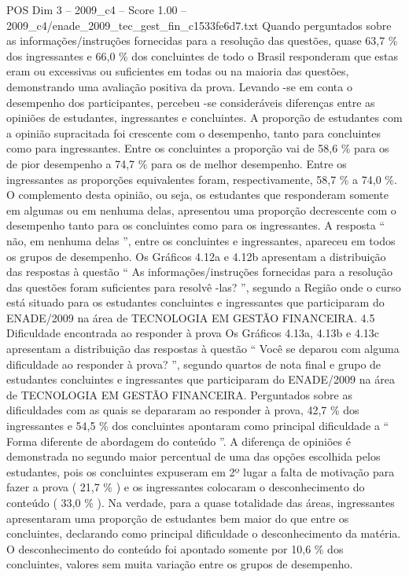 \begin{textsample}{POS Dim 3 – 2009\_c4 – Score 1.00 – 2009\_c4/enade\_2009\_tec\_gest\_fin\_c1533fe6d7.txt}
Quando perguntados sobre as informações/instruções fornecidas para a resolução das questões, quase 63,7 \% dos ingressantes e 66,0 \% dos concluintes de todo o Brasil responderam que estas eram ou excessivas ou suficientes em todas ou na maioria das questões, demonstrando uma avaliação positiva da prova.
Levando -se em conta o desempenho dos participantes, percebeu -se consideráveis diferenças entre as opiniões de estudantes, ingressantes e concluintes.
A proporção de estudantes com a opinião supracitada foi crescente com o desempenho, tanto para concluintes como para ingressantes.
Entre os concluintes a proporção vai de 58,6 \% para os de pior desempenho a 74,7 \% para os de melhor desempenho.
Entre os ingressantes as proporções equivalentes foram, respectivamente, 58,7 \% a 74,0 \%.
O complemento desta opinião, ou seja, os estudantes que responderam somente em algumas ou em nenhuma delas, apresentou uma proporção decrescente com o desempenho tanto para os concluintes como para os ingressantes.
A resposta “ não, em nenhuma delas ”, entre os concluintes e ingressantes, apareceu em todos os grupos de desempenho.
Os Gráficos 4.12a e 4.12b apresentam a distribuição das respostas à questão “ As informações/instruções fornecidas para a resolução das questões foram suficientes para resolvê -las? ”, segundo a Região onde o curso está situado para os estudantes concluintes e ingressantes que participaram do ENADE/2009 na área de TECNOLOGIA EM GESTÃO FINANCEIRA. 4.5 Dificuldade encontrada ao responder à prova Os Gráficos 4.13a, 4.13b e 4.13c apresentam a distribuição das respostas à questão “ Você se deparou com alguma dificuldade ao responder à prova? ”, segundo quartos de nota final e grupo de estudantes concluintes e ingressantes que participaram do ENADE/2009 na área de TECNOLOGIA EM GESTÃO FINANCEIRA.
Perguntados sobre as dificuldades com as quais se depararam ao responder à prova, 42,7 \% dos ingressantes e 54,5 \% dos concluintes apontaram como principal dificuldade a “ Forma diferente de abordagem do conteúdo ”.
A diferença de opiniões é demonstrada no segundo maior percentual de uma das opções escolhida pelos estudantes, pois os concluintes expuseram em 2º lugar a falta de motivação para fazer a prova ( 21,7 \% ) e os ingressantes colocaram o desconhecimento do conteúdo ( 33,0 \% ).
Na verdade, para a quase totalidade das áreas, ingressantes apresentaram uma proporção de estudantes bem maior do que entre os concluintes, declarando como principal dificuldade o desconhecimento da matéria.
O desconhecimento do conteúdo foi apontado somente por 10,6 \% dos concluintes, valores sem muita variação entre os grupos de desempenho.

\end{textsample}
